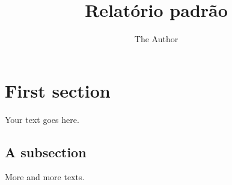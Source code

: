 \documentclass[11pt]{article}
\title{Relatório padrão}
\author{The Author}
\begin{document}
\maketitle

\section{First section}

Your text goes here.

\subsection{A subsection}

More and more texts.
\end{document}
